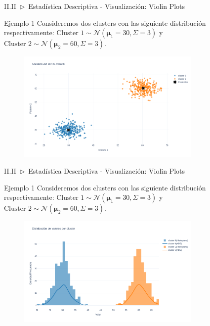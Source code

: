 \documentclass[xcolor=dvipsnames]{beamer}
\begin{document}
    \begin{frame}{II.II~$\rhd$~Estadística Descriptiva - Visualización: Violin Plots}
        \begin{exampleblock}{Ejemplo 1}
        Consideremos dos clusters con las siguiente distribución respectivamente: $\text{Cluster 1} \sim \mathcal{N}(\boldsymbol{\mu}_1=30, \Sigma=3)$ y $\text{Cluster 2} \sim \mathcal{N}(\boldsymbol{\mu}_2=60, \Sigma=3)$.
        \end{exampleblock}
        \begin{figure}
            \centering
            \includegraphics[width=0.8\textwidth]{imgs/violin/ej_01.png}
        \end{figure}
    \end{frame}

    \begin{frame}{II.II~$\rhd$~Estadística Descriptiva - Visualización: Violin Plots}
        \begin{exampleblock}{Ejemplo 1}
        Consideremos dos clusters con las siguiente distribución respectivamente: $\text{Cluster 1} \sim \mathcal{N}(\boldsymbol{\mu}_1=30, \Sigma=3)$ y $\text{Cluster 2} \sim \mathcal{N}(\boldsymbol{\mu}_2=60, \Sigma=3)$.
        \end{exampleblock}
        \begin{figure}
            \centering
            \includegraphics[width=0.8\textwidth]{imgs/violin/ej_02.png}
        \end{figure}
    \end{frame}
\end{document}
